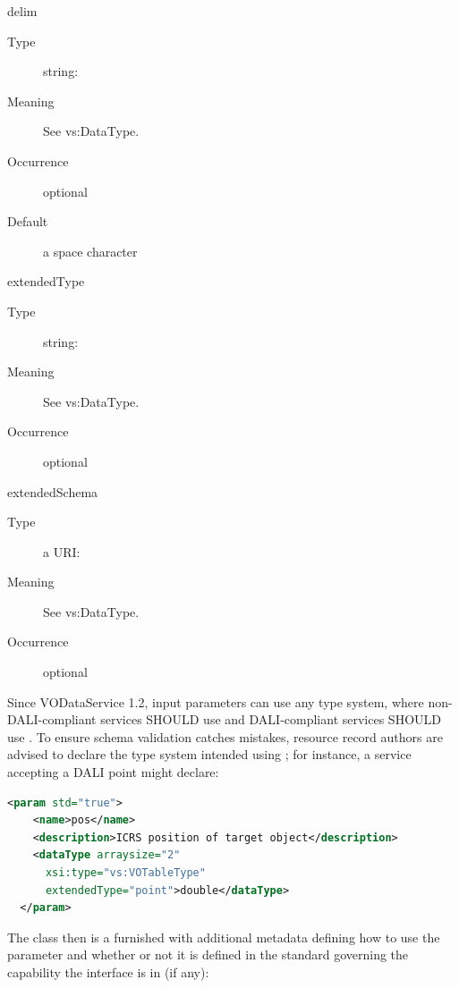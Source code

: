 \documentclass[11pt,a4paper]{ivoa}
\begin{document}
\begin{generated}
\begin{bigdescription}
\begin{description}
\end{description}
\item[delim]
\begin{description}
\item[Type] string: 
\item[Meaning] See vs:DataType.
\item[Occurrence] optional
\item[Default] a space character
\end{description}
\item[extendedType]
\begin{description}
\item[Type] string: 
\item[Meaning] See vs:DataType.
\item[Occurrence] optional
\end{description}
\item[extendedSchema]
\begin{description}
\item[Type] a URI: 
\item[Meaning] See vs:DataType.
\item[Occurrence] optional
\end{description}


\end{bigdescription}\endgroup

\endgroup
\end{generated}


Since VODataService 1.2, input parameters can use any type system,
where non-DALI-compliant services SHOULD use 
and DALI-compliant services SHOULD use .  To
ensure schema validation catches mistakes, resource record authors are
advised to declare the type system intended using ; for
instance, a service accepting a DALI point might declare:

\begin{lstlisting}[language=XML]
  <param std="true">
    <name>pos</name>
    <description>ICRS position of target object</description>
    <dataType arraysize="2"
      xsi:type="vs:VOTableType"
      extendedType="point">double</dataType>
  </param>
\end{lstlisting}

The  class then is a 
furnished with additional metadata
defining how to use the parameter and whether or not it is defined in
the standard governing the capability the interface is in (if any):
\end{document}
